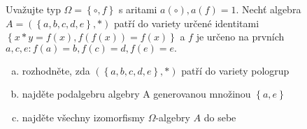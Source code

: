 Uvažujte typ $\Omega =\left \{ \circ,f  \right \}$ s aritami $a\left ( \circ
\right ),a(f)=1$. Nechť algebra $A=\left ( \left \{ a,b,c,d,e \right \},* \right
)$ patří do variety určené identitami $\left \{ x*y =f(x) ,
f(f(x))=f(x)\right \}$ a $f$ je určeno na prvních $a,c,e:f(a)=b,f(c)=d,f(e)=e.$

\begin{enumerate}[a)]
  \item rozhodněte, zda $\left ( \left \{ a,b,c,d,e \right \},* \right )$ patří do variety pologrup
  \item najděte podalgebru algebry A generovanou množinou $\left \{ a,e \right \}$
  \item najděte všechny izomorfismy $\Omega$-algebry $A$ do sebe
\end{enumerate}
